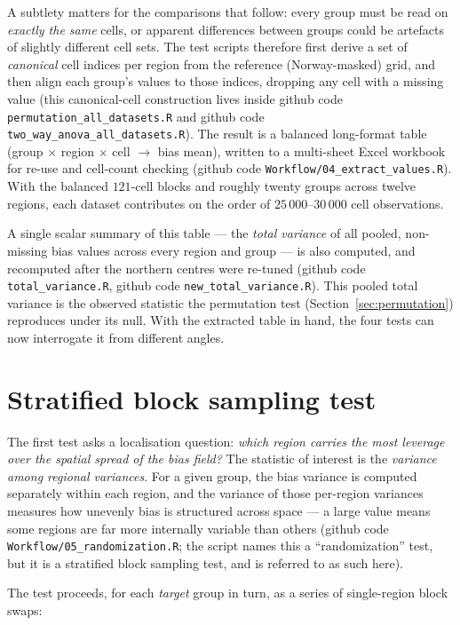 A subtlety matters for the comparisons that follow: every group must be
read on \emph{exactly the same} cells, or apparent differences between
groups could be artefacts of slightly different cell sets. The test scripts
therefore first derive a set of \emph{canonical} cell indices per region
from the reference (Norway-masked) grid, and then align each group's values
to those indices, dropping any cell with a missing value (this
canonical-cell construction lives inside github code
\texttt{permutation\_all\_datasets.R} and github code
\texttt{two\_way\_anova\_all\_datasets.R}). The result is a balanced
long-format table (group $\times$ region $\times$ cell $\rightarrow$ bias
mean), written to a multi-sheet Excel workbook for re-use and cell-count
checking (github code \texttt{Workflow/04\_extract\_values.R}). With the
balanced $121$-cell blocks and roughly twenty groups across twelve regions,
each dataset contributes on the order of $25\,000$--$30\,000$ cell
observations.

A single scalar summary of this table --- the \emph{total variance} of all
pooled, non-missing bias values across every region and group --- is also
computed, and recomputed after the northern centres were re-tuned (github
code \texttt{total\_variance.R}, github code \texttt{new\_total\_variance.R}).
This pooled total variance is the observed statistic the permutation test
(Section~\ref{sec:permutation}) reproduces under its null. With the extracted
table in hand, the four tests can now interrogate it from different angles.

\section{Stratified block sampling test}
\label{sec:block}

The first test asks a localisation question: \emph{which region carries the
most leverage over the spatial spread of the bias field?} The statistic of
interest is the \emph{variance among regional variances}. For a given
group, the bias variance is computed separately within each region, and the
variance of those per-region variances measures how unevenly bias is
structured across space --- a large value means some regions are far more
internally variable than others (github code
\texttt{Workflow/05\_randomization.R}; the script names this a
``randomization'' test, but it is a stratified block sampling test, and is
referred to as such here).

The test proceeds, for each \emph{target} group in turn, as a series of
single-region block swaps:


